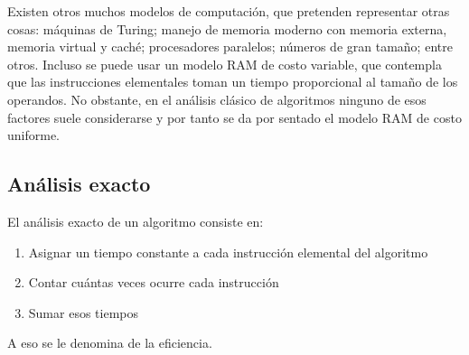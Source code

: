 Existen otros muchos modelos de computación, que pretenden representar otras cosas: máquinas de Turing; manejo de memoria moderno con memoria externa, memoria virtual y caché; procesadores paralelos; números de gran tamaño; entre otros. Incluso se puede usar un modelo RAM de costo variable, que contempla que las instrucciones elementales toman un tiempo proporcional al tamaño de los operandos. No obstante, en el análisis clásico de algoritmos ninguno de esos factores suele considerarse y por tanto se da por sentado el modelo RAM de costo uniforme.

\subsection{Análisis exacto}

El análisis exacto de un algoritmo consiste en:
\begin{enumerate} 
  \item Asignar un tiempo constante a cada instrucción elemental del algoritmo
  \item Contar cuántas veces ocurre cada instrucción
  \item Sumar esos tiempos
\end{enumerate}
A eso se le denomina  de la eficiencia.



